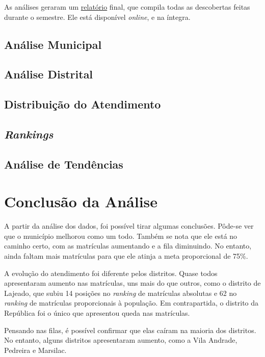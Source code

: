 \documentclass[12pt, a4paper]{article}
\begin{document}
As análises geraram um \href{https://lsflp.github.io/MAC0213/relatorios/relatorio.pdf}{relatório} final, que compila todas as descobertas feitas durante o semestre. Ele está disponível \textit{online}, e na íntegra.

\subsection{Análise Municipal}

\subsection{Análise Distrital}

\subsection{Distribuição do Atendimento}

\subsection{\textit{Rankings}}

\subsection{Análise de Tendências}

\section{Conclusão da Análise}

A partir da análise dos dados, foi possível tirar algumas conclusões. Pôde-se ver que o município melhorou como um todo. Também se nota que ele está no caminho certo, com as matrículas aumentando e a fila diminuindo. No entanto, ainda faltam mais matrículas para que ele atinja a meta proporcional de 75\%.

A evolução do atendimento foi diferente pelos distritos. Quase todos apresentaram aumento nas matrículas, uns mais do que outros, como o distrito de Lajeado, que subiu 14 posições no \textit{ranking} de matrículas absolutas e 62 no \textit{ranking} de matrículas proporcionais à população. Em contrapartida, o distrito da República foi o único que apresentou queda nas matrículas.

Pensando nas filas, é possível confirmar que elas caíram na maioria dos distritos. No entanto, alguns distritos apresentaram aumento, como a Vila Andrade, Pedreira e Marsilac.
\end{document}
